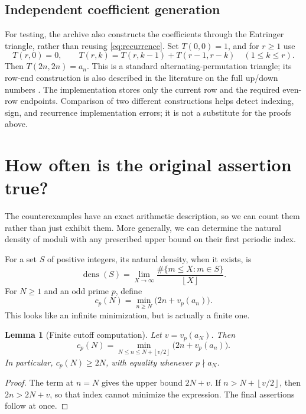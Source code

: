 \documentclass[11pt,a4paper]{article}
\numberwithin{equation}{section}
\newtheorem{lemma}[theorem]{Lemma}
\theoremstyle{definition}
\newcommand{\floor}[1]{\left\lfloor #1\right\rfloor}
\DeclareMathOperator{\dens}{dens}
\begin{document}
\subsection{Independent coefficient generation}

For testing, the archive also constructs the coefficients through the
Entringer triangle, rather than reusing \eqref{eq:recurrence}. Set
$T(0,0)=1$, and for $r\ge1$ use
\[
T(r,0)=0,\qquad
T(r,k)=T(r,k-1)+T(r-1,r-k)\quad(1\le k\le r).
\]
Then $T(2n,2n)=a_n$. This is a standard alternating-permutation triangle;
its row-end construction is also described in the literature on the
full up/down numbers \cite{ramassamy}. The implementation stores only
the current row and the required even-row endpoints. Comparison of two
different constructions helps detect indexing, sign, and recurrence
implementation errors; it is not a substitute for the proofs above.

\section{How often is the original assertion true?}
\label{sec:density}

The counterexamples have an exact arithmetic description, so we can count
them rather than just exhibit them. More generally, we can determine the
natural density of moduli with any prescribed upper bound on their first
periodic index.

For a set $S$ of positive integers, its natural density, when it exists, is
\[
\dens(S)=\lim_{X\to\infty}\frac{\#\{m\le X:m\in S\}}{\floor X}.
\]
For $N\ge1$ and an odd prime $p$, define
\begin{equation}\label{eq:cutoff}
c_p(N)=\min_{n\ge N}\bigl(2n+v_p(a_n)\bigr).
\end{equation}
This looks like an infinite minimization, but is actually a finite one.

\begin{lemma}[Finite cutoff computation]\label{lem:cutoff}
Let $v=v_p(a_N)$. Then
\begin{equation}\label{eq:finitecutoff}
c_p(N)=\min_{N\le n\le N+\floor{v/2}}
             \bigl(2n+v_p(a_n)\bigr).
\end{equation}
In particular, $c_p(N)\ge2N$, with equality whenever $p\nmid a_N$.
\end{lemma}

\begin{proof}
The term at $n=N$ gives the upper bound $2N+v$. If
$n>N+\floor{v/2}$, then $2n>2N+v$, so that index cannot minimize the
expression. The final assertions follow at once.
\end{proof}
\end{document}
